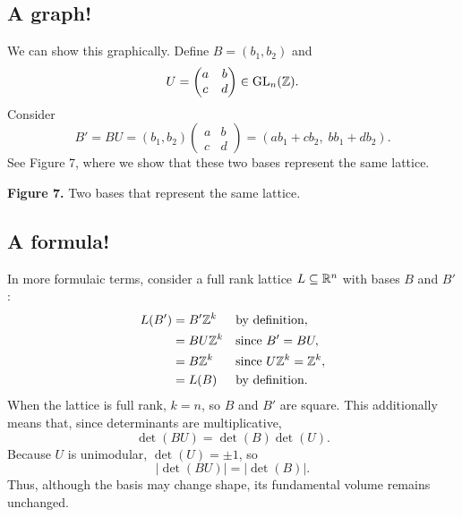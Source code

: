 \documentclass{article}
\begin{document}
\subsection{A graph!}
We can show this graphically.
Define $B = (b_1, b_2)$ and
\[
U=
\begin{pmatrix}
a & b\\
c & d
\end{pmatrix}
\in \operatorname{GL}_n(\mathbb{Z}).
\]
Consider
\[
B'
=
BU
=
(b_1,b_2)
\begin{pmatrix}
a & b\\
c & d
\end{pmatrix}
=
\left(
ab_1+cb_2,\;
bb_1+db_2
\right).
\]
See Figure 7, where we show that these two bases represent the same lattice.

{\textbf{Figure 7.} Two bases that represent the same lattice.}


\subsection{A formula!}
In more formulaic terms, consider a full rank lattice $L\subseteq\mathbb{R}^n$ with bases $B$ and $B'$:
\[
\begin{aligned}
L(B')
    &= B'\mathbb{Z}^k
    && \text{by definition},\\
    &= BU\mathbb{Z}^k
    && \text{since } B'=BU,\\
    &= B\mathbb{Z}^k
    && \text{since } U\mathbb{Z}^k=\mathbb{Z}^k,\\
    &= L(B)
    && \text{by definition}.
\end{aligned}
\]
When the lattice is full rank, $k=n$, so $B$ and $B'$ are square.
This additionally means that, since determinants are multiplicative,
\[
\det(BU) =\det(B)\det(U).
\]
Because $U$ is unimodular, $\det(U) = \pm 1$, so 
\[
\lvert \det(BU) \rvert 
= \lvert \det(B) \rvert.
\]
Thus, although the basis may change shape, its fundamental volume remains unchanged.
\end{document}
